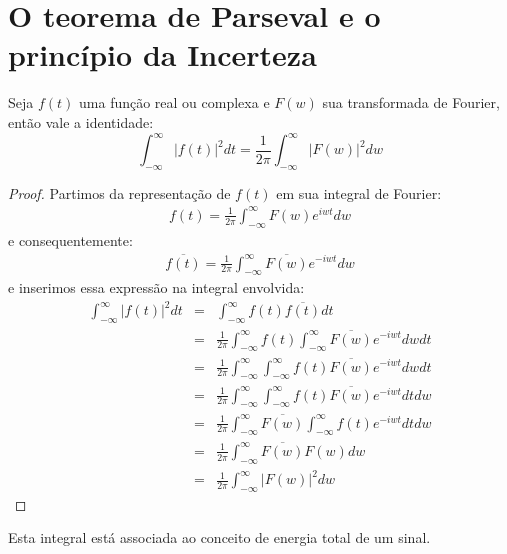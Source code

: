\section{O teorema de Parseval e o princípio da Incerteza}
\begin{teo}\label{prop_teo_pars} Seja $f(t)$ uma função real ou complexa e $F(w)$ sua transformada de Fourier, então vale a identidade:
\begin{equation}\int_{-\infty}^\infty |f(t)|^2dt = \frac{1}{2\pi} \int_{-\infty}^\infty |F(w)|^2dw\end{equation}
\end{teo}
\begin{proof}
Partimos da representação de $f(t)$ em sua integral de Fourier:
\begin{eqnarray*}
f(t)=\frac{1}{2\pi}\int_{-\infty}^\infty F(w)e^{iwt}dw
\end{eqnarray*}
e consequentemente:
\begin{eqnarray*}
\overline{f(t)}=\frac{1}{2\pi}\int_{-\infty}^\infty \overline{F(w)}e^{-iwt}dw
\end{eqnarray*}
e inserimos essa expressão na integral envolvida:
\begin{eqnarray*}
\int_{-\infty}^\infty |f(t)|^2dt &=&\int_{-\infty}^\infty f(t)\overline{f(t)} dt\\
&=&\frac{1}{2\pi}\int_{-\infty}^\infty f(t)\int_{-\infty}^\infty \overline{F(w)}e^{-iwt}dw dt\\
&=&\frac{1}{2\pi}\int_{-\infty}^\infty \int_{-\infty}^\infty f(t) \overline{F(w)}e^{-iwt}dw dt\\
&=&\frac{1}{2\pi}\int_{-\infty}^\infty \int_{-\infty}^\infty f(t) \overline{F(w)}e^{-iwt}dt dw\\
&=&\frac{1}{2\pi}\int_{-\infty}^\infty \overline{F(w)}\int_{-\infty}^\infty f(t) e^{-iwt}dt dw\\
&=&\frac{1}{2\pi}\int_{-\infty}^\infty \overline{F(w)}F(w) dw\\
&=&\frac{1}{2\pi}\int_{-\infty}^\infty |F(w)|^2 dw
\end{eqnarray*}
\end{proof}
\begin{obs}Esta integral está associada ao conceito de energia total de um sinal. 
\end{obs}
